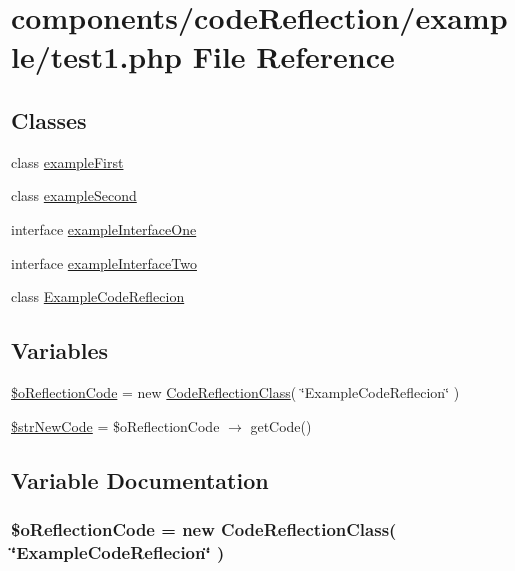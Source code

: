 \hypertarget{code_reflection_2example_2test1_8php}{
\section{components/codeReflection/example/test1.php File Reference}
\label{code_reflection_2example_2test1_8php}
}
\subsection*{Classes}
\begin{CompactItemize}
\item 
class \hyperlink{classexample_first}{exampleFirst}
\item 
class \hyperlink{classexample_second}{exampleSecond}
\item 
interface \hyperlink{interfaceexample_interface_one}{exampleInterfaceOne}
\item 
interface \hyperlink{interfaceexample_interface_two}{exampleInterfaceTwo}
\item 
class \hyperlink{class_example_code_reflecion}{ExampleCodeReflecion}
\end{CompactItemize}
\subsection*{Variables}
\begin{CompactItemize}
\item 
\hyperlink{code_reflection_2example_2test1_8php_dff853bfc3335950f89bfb9e1a779c7e}{\$oReflectionCode} = new \hyperlink{class_code_reflection_class}{CodeReflectionClass}( \char`\"{}ExampleCodeReflecion\char`\"{} )
\item 
\hyperlink{code_reflection_2example_2test1_8php_882f0b62de6f379d0e0cf88ef6658601}{\$strNewCode} = \$oReflectionCode $\rightarrow$ getCode()
\end{CompactItemize}


\subsection{Variable Documentation}
\hypertarget{code_reflection_2example_2test1_8php_dff853bfc3335950f89bfb9e1a779c7e}{
\subsubsection[{\$oReflectionCode}]{\setlength{\rightskip}{0pt plus 5cm}\$oReflectionCode = new {\bf CodeReflectionClass}( \char`\"{}ExampleCodeReflecion\char`\"{} )}}
\label{code_reflection_2example_2test1_8php_dff853bfc3335950f89bfb9e1a779c7e}


